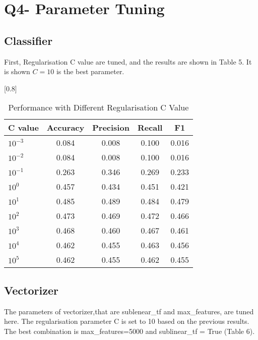 \documentclass[a4paper,11pt]{article}
\begin{document}
\section{Q4- Parameter Tuning}
\subsection{Classifier}
First, Regularisation C value are tuned, and the results are shown in Table 5.
It is shown $C=10$ is the best parameter.%

\begin{table}[htbp]
    \centering
    \caption{Performance with Different Regularisation C Value}
    \scalebox{0.8}[0.8]{
    \begin{tabular}{l|cccc}
        C value & Accuracy & Precision & Recall & F1 \\ \hline 
        $10^{-3}$ &0.084 & 0.008& 0.100& 0.016\\ 
        $10^{-2}$ &0.084 &0.008 &0.100 &0.016\\ 
        $10^{-1}$ &0.263 &0.346 &0.269 &0.233\\ 
        $10^{0}$  &0.457 &0.434 &0.451 &0.421\\ 
        \rowcolor[rgb]{0.9,0.9,0}$10^{1}$  &0.485 &0.489 &0.484 &0.479\\ 
        $10^{2}$  &0.473 &0.469 &0.472 &0.466\\ 
        $10^{3}$  &0.468 &0.460 &0.467 &0.461\\ 
        $10^{4}$  &0.462 &0.455 &0.463 &0.456\\ 
        $10^{5}$  &0.462 &0.455 &0.462 &0.455\\ 

    \end{tabular}
    }
\end{table}
\subsection{Vectorizer}
The parameters of vectorizer,that are sublenear\_tf and max\_features, are tuned here.
The regularisation parameter C is set to 10 based on the previous results.
The best combination is max\_features=5000 and  sublinear\_tf = True (Table 6). 
\end{document}
